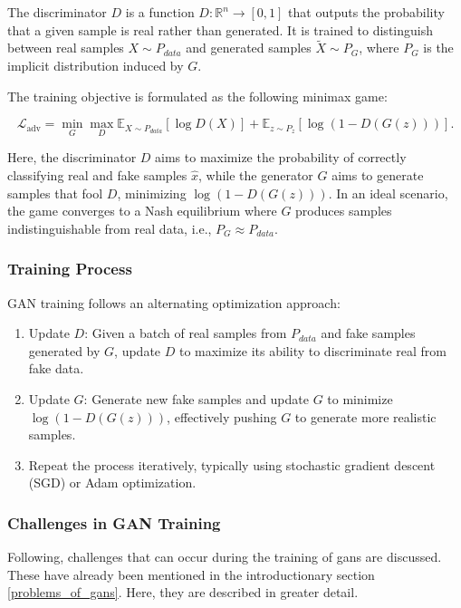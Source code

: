 The discriminator \(D\) is a function \(D: \mathbb{R}^n \to [0,1]\) that outputs the probability that a given sample is real rather than generated. It is trained to distinguish between real samples \(X \sim P_{data}\) and generated samples \(\tilde{X} \sim P_G\), where \(P_G\) is the implicit distribution induced by \(G\).

The training objective is formulated as the following minimax game:

    \begin{equation}\label{theory_gan_vanilla_formula}
        \mathcal{L}_{\text{adv}} = \min_G \max_D \mathbb{E}_{X \sim P_{data}} [\log D(X)] + \mathbb{E}_{z \sim P_z} [\log (1 - D(G(z)))].
    \end{equation}

Here, the discriminator \(D\) aims to maximize the probability of correctly classifying real and fake samples \(\hat{x}\), while the generator \(G\) aims to generate samples that fool \(D\), minimizing \(\log(1 - D(G(z)))\). In an ideal scenario, the game converges to a Nash equilibrium where \(G\) produces samples indistinguishable from real data, i.e., \(P_G \approx P_{data}\).

\subsubsection{Training Process}\label{theoretical_gan_training}
GAN training follows an alternating optimization approach:
\begin{enumerate}
    \item Update \(D\): Given a batch of real samples from \(P_{data}\) and fake samples generated by \(G\), update \(D\) to maximize its ability to discriminate real from fake data.
    \item Update \(G\): Generate new fake samples and update \(G\) to minimize \\ \(\log(1 - D(G(z)))\), effectively pushing \(G\) to generate more realistic samples.
    \item Repeat the process iteratively, typically using stochastic gradient descent (SGD) or Adam optimization.
\end{enumerate}

\subsubsection{Challenges in GAN Training}\label{theory_gan_problems}
Following, challenges that can occur during the training of gans are discussed. These have already been mentioned in the introductionary section \ref{problems_of_gans}. Here, they are described in greater detail.

